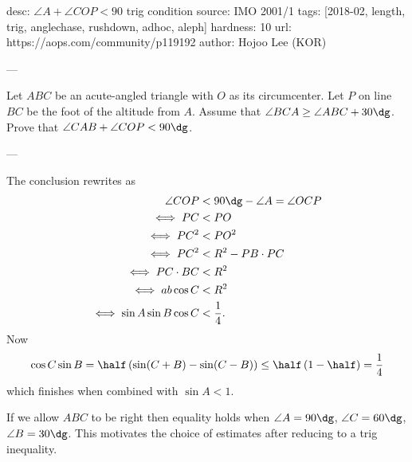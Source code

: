 desc: $\angle A + \angle COP < 90$ trig condition
source: IMO 2001/1
tags: [2018-02, length, trig, anglechase, rushdown, adhoc, aleph]
hardness: 10
url: https://aops.com/community/p119192
author: Hojoo Lee (KOR)

---

Let $ABC$ be an acute-angled triangle with $O$ as its circumcenter.
Let $P$ on line $BC$ be the foot of the altitude from $A$.
Assume that $\angle BCA \ge \angle ABC + 30\dg$.
Prove that $\angle CAB + \angle COP < 90\dg$.

---

The conclusion rewrites as
\begin{align*}
  \angle COP &< 90\dg - \angle A = \angle OCP \\
  \iff PC &< PO \\
  \iff PC^2 &< PO^2 \\
  \iff PC^2 &< R^2 - PB \cdot PC \\
  \iff PC \cdot BC &< R^2 \\
  \iff ab \cos C  &< R^2 \\
  \iff \sin A \sin B \cos C & < \frac14.
\end{align*}
Now
\[ \cos C \sin B
  = \half \left( \sin(C+B)-\sin(C-B) \right)
  \le \half \left( 1 - \half \right) = \frac 14 \]
which finishes when combined with $\sin A < 1$.

\begin{remark*}
  If we allow $ABC$ to be right then
  equality holds when $\angle A = 90\dg$,
  $\angle C = 60\dg$, $\angle B = 30\dg$.
  This motivates the choice of estimates
  after reducing to a trig inequality.
\end{remark*}
